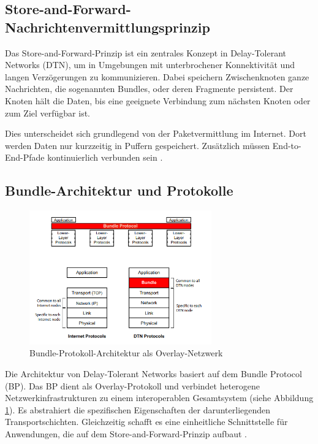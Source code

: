 \documentclass[paper=a4,fontsize=12pt,ngerman]{scrartcl}
\begin{document}
\subsection{Store-and-Forward-Nachrichtenvermittlungsprinzip}

Das Store-and-Forward-Prinzip ist ein zentrales Konzept in Delay-Tolerant Networks (DTN), um in Umgebungen mit unterbrochener Konnektivität und langen Verzögerungen zu kommunizieren. 
Dabei speichern Zwischenknoten ganze Nachrichten, die sogenannten Bundles, oder deren Fragmente persistent. 
Der Knoten hält die Daten, bis eine geeignete Verbindung zum nächsten Knoten oder zum Ziel verfügbar ist. 

Dies unterscheidet sich grundlegend von der Paketvermittlung im Internet.
Dort werden Daten nur kurzzeitig in Puffern gespeichert. 
Zusätzlich müssen End-to-End-Pfade kontinuierlich verbunden sein \cite[S. 11]{Wart15}.

\subsection{Bundle-Architektur und Protokolle}

\begin{figure}[H]
\centering
\includegraphics[width=0.7\textwidth]{graphics/BundleProtokol.png}
\caption{Bundle-Protokoll-Architektur als Overlay-Netzwerk \cite[S.15]{Wart15}}
\label{fig:bundleprotokoll}
\end{figure}

Die Architektur von Delay-Tolerant Networks basiert auf dem Bundle Protocol (BP). 
Das BP dient als Overlay-Protokoll und verbindet heterogene Netzwerkinfrastrukturen zu einem interoperablen Gesamtsystem (siehe Abbildung \ref{fig:bundleprotokoll}). 
Es abstrahiert die spezifischen Eigenschaften der darunterliegenden Transportschichten. 
Gleichzeitig schafft es eine einheitliche Schnittstelle für Anwendungen, die auf dem Store-and-Forward-Prinzip aufbaut \cite[S. 6]{CBH+07}.
\end{document}
